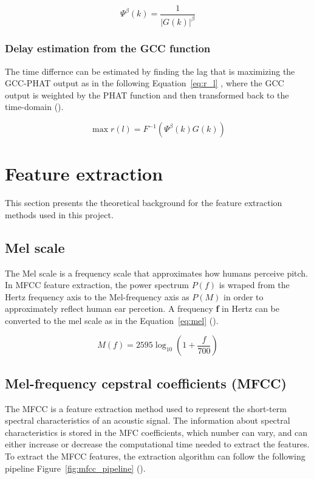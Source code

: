     \begin{equation}
        \label{eq:phat}
        \Psi^\beta (k) = \frac{1}{|G(k)|^\beta}
    \end{equation}
    
    \subsubsection{Delay estimation from the GCC function}
    \label{sec:delay_estimation_from_gcc}
        The time differnce can be estimated by finding the lag that is maximizing the GCC-PHAT output as in the following Equation~\ref{eq:r_l} %
        , where the GCC output is weighted by the PHAT function and then transformed back to the time-domain (\cite{kang2016prefiltering}).

    \begin{equation}
        \label{eq:r_l}
        \max r(l) = F^{-1}(\Psi^{\beta}(k)G(k))
    \end{equation}

    
\section{Feature extraction}
This section presents the theoretical background for the feature extraction methods used in this project.

    \subsection{Mel scale}
    \label{sec:MEL}

    The Mel scale is a frequency scale that approximates how humans perceive pitch. In MFCC feature extraction, the power spectrum \(P(f)\) is wraped from the Hertz frequency axis to the Mel-frequency axis as \(P(M)\) in order to approximately reflect human ear percetion. A frequency \textbf{f} in Hertz can be converted to the mel scale as in the Equation~\ref{eq:mel} (\cite{zheng2001mfcc}).


    \begin{equation}
        \label{eq:mel}
        M(f) = 2595\log_{10}(1+\frac{f}{700})
    \end{equation}

    \subsection{Mel-frequency cepstral coefficients (MFCC) }
    \label{sec:MFCC}
    The MFCC is a feature extraction method used to represent the short-term spectral characteristics of an acoustic signal. The information about spectral characteristics is stored in the MFC coefficients, which number can vary, and can either increase or decrease the computational time needed to extract the features. To extract the MFCC features, the extraction algorithm can follow the following pipeline Figure~\ref{fig:mfcc_pipeline} (\cite{singh2014mfcc}).

